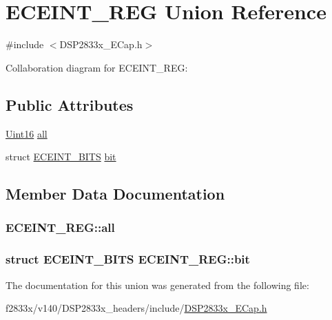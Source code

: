 \hypertarget{union_e_c_e_i_n_t___r_e_g}{}\section{E\+C\+E\+I\+N\+T\+\_\+\+R\+E\+G Union Reference}
\label{union_e_c_e_i_n_t___r_e_g}


{\ttfamily \#include $<$D\+S\+P2833x\+\_\+\+E\+Cap.\+h$>$}



Collaboration diagram for E\+C\+E\+I\+N\+T\+\_\+\+R\+E\+G\+:
\subsection*{Public Attributes}
\begin{DoxyCompactItemize}
\item 
\hyperlink{_d_s_p2833x___device_8h_a59a9f6be4562c327cbfb4f7e8e18f08b}{Uint16} \hyperlink{union_e_c_e_i_n_t___r_e_g_a05772d66509f4bd93db324e8b82b1794}{all}
\item 
struct \hyperlink{struct_e_c_e_i_n_t___b_i_t_s}{E\+C\+E\+I\+N\+T\+\_\+\+B\+I\+T\+S} \hyperlink{union_e_c_e_i_n_t___r_e_g_abcc762591cd216e560fc38be7be539ee}{bit}
\end{DoxyCompactItemize}


\subsection{Member Data Documentation}
\hypertarget{union_e_c_e_i_n_t___r_e_g_a05772d66509f4bd93db324e8b82b1794}{}
\subsubsection[{all}]{ E\+C\+E\+I\+N\+T\+\_\+\+R\+E\+G\+::all}\label{union_e_c_e_i_n_t___r_e_g_a05772d66509f4bd93db324e8b82b1794}
\hypertarget{union_e_c_e_i_n_t___r_e_g_abcc762591cd216e560fc38be7be539ee}{}
\subsubsection[{bit}]{\setlength{\rightskip}{0pt plus 5cm}struct {\bf E\+C\+E\+I\+N\+T\+\_\+\+B\+I\+T\+S} E\+C\+E\+I\+N\+T\+\_\+\+R\+E\+G\+::bit}\label{union_e_c_e_i_n_t___r_e_g_abcc762591cd216e560fc38be7be539ee}


The documentation for this union was generated from the following file\+:\begin{DoxyCompactItemize}
\item 
f2833x/v140/\+D\+S\+P2833x\+\_\+headers/include/\hyperlink{_d_s_p2833x___e_cap_8h}{D\+S\+P2833x\+\_\+\+E\+Cap.\+h}\end{DoxyCompactItemize}
